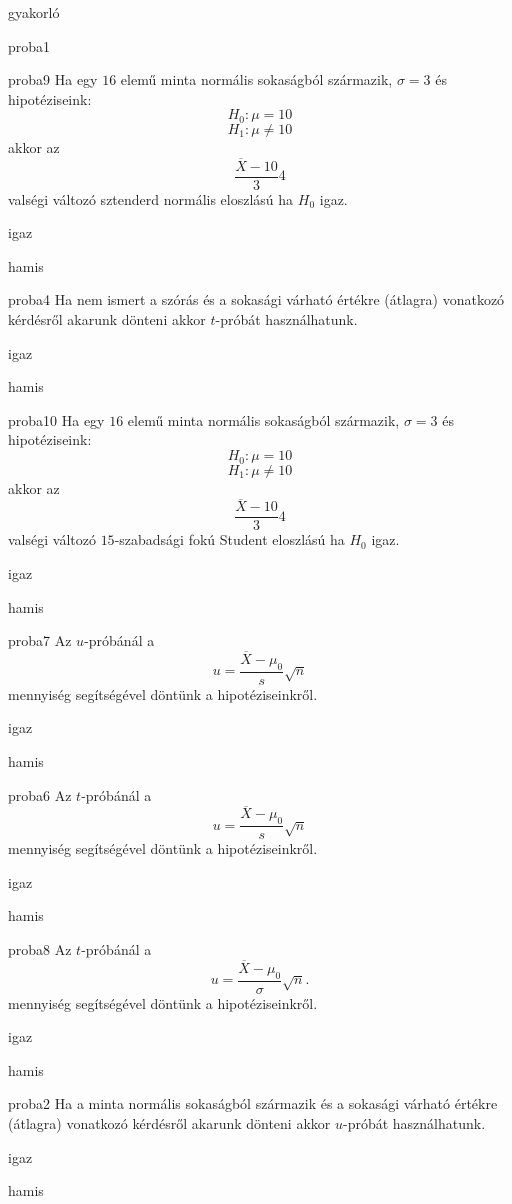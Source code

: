 \documentclass[12pt]{article}
\begin{document}
\begin{quiz}{gyakorló}
\begin{multi}[feedback={Ezek az $u$-próba használatának előzményei.}]{proba1}
\end{multi}
\begin{multi}[feedback={Igen, éppen ez alapján tudunk dönteni. Ahhoz képest hogy sztenderd normális átlagos, tipikus értéket, vagy kiugró, extrém értéket látunk.}]{proba9}
Ha egy $16$ elemű minta normális sokaságból származik, $\sigma=3$ és hipotéziseink:
$$
H_0: \mu=10
$$
$$
H_1: \mu\neq 10
$$
akkor az 
$$
\frac{\overline{X}-10}{3}4
$$
valségi változó sztenderd normális eloszlású ha $H_0$ igaz.
\item* igaz
\item hamis
\end{multi}
\begin{multi}[feedback={A normalitás fontos.}]{proba4}
Ha nem ismert a szórás és a sokasági várható értékre (átlagra) vonatkozó kérdésről 
akarunk dönteni akkor $t$-próbát használhatunk.
\item igaz
\item* hamis
\end{multi}
\begin{multi}[feedback={A feltételek mellett a fenti mennyiség sztenderd normális, ha $H_0$ igaz.}]{proba10}
Ha egy $16$ elemű minta normális sokaságból származik, $\sigma=3$ és hipotéziseink:
$$
H_0: \mu=10
$$
$$
H_1: \mu\neq 10
$$
akkor az 
$$
\frac{\overline{X}-10}{3}4
$$
valségi változó $15$-szabadsági fokú Student eloszlású ha $H_0$ igaz.
\item igaz
\item* hamis
\end{multi}
\begin{multi}[feedback={A fenti formula az $t$-próba ún. próbastatisztikája.}]{proba7}
Az $u$-próbánál a 
$$
u=\frac{\overline{X}-\mu_0}{s}\sqrt{n}
$$
mennyiség segítségével döntünk a hipotéziseinkről.
\item igaz
\item* hamis
\end{multi}
\begin{multi}[feedback={A fenti formula a $t$-próba ún. próbastatisztikája.}]{proba6}
Az $t$-próbánál a 
$$
u=\frac{\overline{X}-\mu_0}{s}\sqrt{n}
$$
mennyiség segítségével döntünk a hipotéziseinkről.
\item* igaz
\item hamis
\end{multi}
\begin{multi}[feedback={A fenti formula a $u$-próba ún. próbastatisztikája.}]{proba8}
Az $t$-próbánál a 
$$
u=\frac{\overline{X}-\mu_0}{\sigma}\sqrt{n}.
$$
mennyiség segítségével döntünk a hipotéziseinkről.
\item igaz
\item* hamis
\end{multi}
\begin{multi}[feedback={A szórást ismerni kell.}]{proba2}
Ha a minta normális sokaságból származik és a sokasági várható értékre (átlagra) vonatkozó kérdésről 
akarunk dönteni akkor $u$-próbát használhatunk.
\item igaz
\item* hamis
\end{multi}
\end{quiz}
\end{document}
